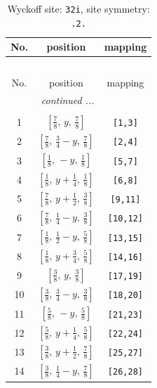 \documentclass[fleqn,8pt]{jsarticle}
\begin{document}
\begin{longtable}{ccc}
\caption{Wyckoff site: {\tt 32i}, site symmetry: {\tt .2.}}
 \\
 \hline \hline
No. & position & mapping \\ \hline \endfirsthead

\multicolumn{2}{l}{\tablename\ \thetable{}} \\
 \hline \hline
No. & position & mapping \\ \hline \endhead

 \hline \hline
\multicolumn{2}{r}{\footnotesize\it continued ...} \\ \endfoot

 \hline \hline
\multicolumn{2}{r}{} \\ \endlastfoot

1 & $\left[ \frac{7}{8},\, y,\, \frac{7}{8} \right]$ & {\tt [1,3]} \\ \hline
2 & $\left[ \frac{7}{8},\, \frac{3}{4} - y,\, \frac{7}{8} \right]$ & {\tt [2,4]} \\ \hline
3 & $\left[ \frac{1}{8},\, - y,\, \frac{1}{8} \right]$ & {\tt [5,7]} \\ \hline
4 & $\left[ \frac{1}{8},\, y + \frac{1}{4},\, \frac{1}{8} \right]$ & {\tt [6,8]} \\ \hline
5 & $\left[ \frac{7}{8},\, y + \frac{1}{2},\, \frac{3}{8} \right]$ & {\tt [9,11]} \\ \hline
6 & $\left[ \frac{7}{8},\, \frac{1}{4} - y,\, \frac{3}{8} \right]$ & {\tt [10,12]} \\ \hline
7 & $\left[ \frac{1}{8},\, \frac{1}{2} - y,\, \frac{5}{8} \right]$ & {\tt [13,15]} \\ \hline
8 & $\left[ \frac{1}{8},\, y + \frac{3}{4},\, \frac{5}{8} \right]$ & {\tt [14,16]} \\ \hline
9 & $\left[ \frac{3}{8},\, y,\, \frac{3}{8} \right]$ & {\tt [17,19]} \\ \hline
10 & $\left[ \frac{3}{8},\, \frac{3}{4} - y,\, \frac{3}{8} \right]$ & {\tt [18,20]} \\ \hline
11 & $\left[ \frac{5}{8},\, - y,\, \frac{5}{8} \right]$ & {\tt [21,23]} \\ \hline
12 & $\left[ \frac{5}{8},\, y + \frac{1}{4},\, \frac{5}{8} \right]$ & {\tt [22,24]} \\ \hline
13 & $\left[ \frac{3}{8},\, y + \frac{1}{2},\, \frac{7}{8} \right]$ & {\tt [25,27]} \\ \hline
14 & $\left[ \frac{3}{8},\, \frac{1}{4} - y,\, \frac{7}{8} \right]$ & {\tt [26,28]} \\ \hline

\end{longtable}
\end{document}
